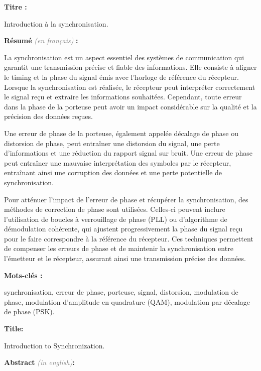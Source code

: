 \documentclass[11pt]{article}
\newcommand{\Gray}[1]{\textcolor{gray}{\textit{#1}}}
\begin{document}

{\bfseries Titre :}

Introduction à la synchronisation.

{\bfseries Résumé} \Gray{(en français)} {\bfseries :}

La synchronisation est un aspect essentiel des systèmes de communication qui garantit une transmission précise et fiable des informations. Elle consiste à aligner le timing et la phase du signal émis avec l'horloge de référence du récepteur. Lorsque la synchronisation est réalisée, le récepteur peut interpréter correctement le signal reçu et extraire les informations souhaitées. Cependant, toute erreur dans la phase de la porteuse peut avoir un impact considérable sur la qualité et la précision des données reçues.

Une erreur de phase de la porteuse, également appelée décalage de phase ou distorsion de phase, peut entraîner une distorsion du signal, une perte d'informations et une réduction du rapport signal sur bruit. Une erreur de phase peut entraîner une mauvaise interprétation des symboles par le récepteur, entraînant ainsi une corruption des données et une perte potentielle de synchronisation.

Pour atténuer l'impact de l'erreur de phase et récupérer la synchronisation, des méthodes de correction de phase sont utilisées. Celles-ci peuvent inclure l'utilisation de boucles à verrouillage de phase (PLL) ou d'algorithme de démodulation cohérente, qui ajustent progressivement la phase du signal reçu pour le faire correspondre à la référence du récepteur. Ces techniques permettent de compenser les erreurs de phase et de maintenir la synchronisation entre l'émetteur et le récepteur, assurant ainsi une transmission précise des données.

{\bfseries Mots-clés :}

synchronisation, erreur de phase, porteuse, signal, distorsion, modulation de phase, modulation d'amplitude en quadrature (QAM), modulation par décalage de phase (PSK).

\vspace*{3mm}
\hrulefill
\vspace*{3mm}


{\bfseries Title:}

Introduction to Synchronization.

{\bfseries Abstract} \Gray{(in english)}{\bfseries:}
\end{document}
